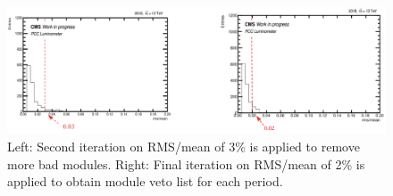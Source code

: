 \begin{figure}[!htp]
    \centering
        \centering
        \includegraphics[width=1.0\linewidth]{ashish_thesis/3percent_cut_1.png}
    
    \caption[Second and final iteration for outlier modules]{%
        Left: Second iteration on RMS/mean of 3\% is applied to remove more bad modules. 
        Right: Final iteration on RMS/mean of 2\% is applied to obtain module veto list for each period.
    }
    \label{fig:sec_it_cut}
\end{figure}



